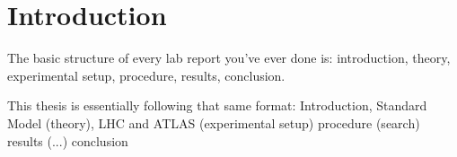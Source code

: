 \chapter{Introduction}\label{chapter:introduction}

The basic structure of every lab report you've ever done is: 
    introduction,
    theory,
    experimental setup,
    procedure,
    results,
    conclusion.

This thesis is essentially following that same format:
    Introduction,
    Standard Model (theory),
    LHC and ATLAS (experimental setup)
    procedure (search)
    results (...)
    conclusion

%


